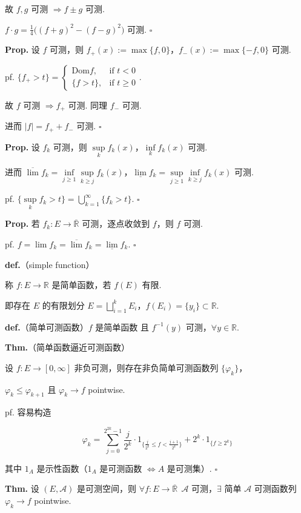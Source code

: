 \documentclass[11pt]{ctexart}
\theoremstyle{definition}
\begin{document}
故 $f, g$ 可测 $\Rightarrow f \pm g$ 可测.

$f \cdot g = \tfrac{1}{4}\big((f+g)^2 - (f-g)^2\big)$ 可测. $\square$

\textbf{Prop.} 设 $f$ 可测，则 $f_+(x) := \max\{f, 0\}$，$f_-(x) := \max\{-f, 0\}$ 可测.

pf. $\{f_+ > t\} = \begin{cases} \mathrm{Dom} f, & \text{if } t < 0 \\ \{f > t\}, & \text{if } t \geq 0 \end{cases}$.

故 $f$ 可测 $\Rightarrow f_+$ 可测. 同理 $f_-$ 可测.

进而 $\vert f\vert = f_+ + f_-$ 可测. $\square$

\textbf{Prop.} 设 $f_k$ 可测，则 $\sup\limits_k f_k(x)$，$\inf\limits_k f_k(x)$ 可测.

进而 $\overline{\lim} f_k = \inf\limits_{j \geq 1} \sup\limits_{k \geq j} f_k(x)$，$\underline{\lim} f_k = \sup\limits_{j \geq 1} \inf\limits_{k \geq j} f_k(x)$ 可测.

pf. $\{\sup\limits_k f_k > t\} = \bigcup\limits_{k=1}^{\infty} \{f_k > t\}$. $\square$

\textbf{Prop.} 若 $f_k: E \to \overline{\mathbb{R}}$ 可测，逐点收敛到 $f$，则 $f$ 可测.

pf. $f = \lim f_k = \overline{\lim} f_k = \underline{\lim} f_k$. $\square$

\textbf{def.}（simple function）

称 $f: E \to \mathbb{R}$ 是简单函数，若 $f(E)$ 有限.

即存在 $E$ 的有限划分 $E = \bigsqcup\limits_{i=1}^{k} E_i$，$f(E_i) = \{y_i\} \subset \mathbb{R}$.

\textbf{def.}（简单可测函数）$f$ 是简单函数 且 $f^{-1}(y)$ 可测，$\forall y \in \mathbb{R}$.

\textbf{Thm.}（简单函数逼近可测函数）

设 $f: E \to [0, \infty]$ 非负可测，则存在非负简单可测函数列 $\{\varphi_k\}$，

$\varphi_k \leq \varphi_{k+1}$ 且 $\varphi_k \to f$  pointwise.

pf. 容易构造

\[
\varphi_k = \sum_{j=0}^{2^{2k}-1} \frac{j}{2^k} \cdot 1_{\{\frac{j}{2^k} \leq f < \frac{j+1}{2^k}\}} + 2^k \cdot 1_{\{f \geq 2^k\}}
\]

其中 $1_A$ 是示性函数（$1_A$ 是可测函数 $\iff A$ 是可测集）. $\square$

\textbf{Thm.} 设 $(E, \mathscr{A})$ 是可测空间，则 $\forall f: E \to \overline{\mathbb{R}}\ \ \mathscr{A}$ 可测，$\exists$ 简单 $\mathscr{A}$ 可测函数列 $\varphi_k \to f$  pointwise.
\end{document}

